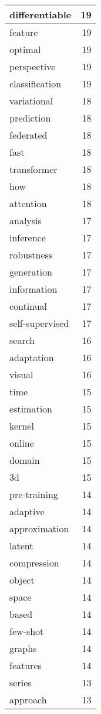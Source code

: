 \begin{table}[h]
\begin{tabular}{|l|r|}
differentiable & 19 \\
\hline
feature & 19 \\
\hline
optimal & 19 \\
\hline
perspective & 19 \\
\hline
classification & 19 \\
\hline
variational & 18 \\
\hline
prediction & 18 \\
\hline
federated & 18 \\
\hline
fast & 18 \\
\hline
transformer & 18 \\
\hline
how & 18 \\
\hline
attention & 18 \\
\hline
analysis & 17 \\
\hline
inference & 17 \\
\hline
robustness & 17 \\
\hline
generation & 17 \\
\hline
information & 17 \\
\hline
continual & 17 \\
\hline
self-supervised & 17 \\
\hline
search & 16 \\
\hline
adaptation & 16 \\
\hline
visual & 16 \\
\hline
time & 15 \\
\hline
estimation & 15 \\
\hline
kernel & 15 \\
\hline
online & 15 \\
\hline
domain & 15 \\
\hline
3d & 15 \\
\hline
pre-training & 14 \\
\hline
adaptive & 14 \\
\hline
approximation & 14 \\
\hline
latent & 14 \\
\hline
compression & 14 \\
\hline
object & 14 \\
\hline
space & 14 \\
\hline
based & 14 \\
\hline
few-shot & 14 \\
\hline
graphs & 14 \\
\hline
features & 14 \\
\hline
series & 13 \\
\hline
approach & 13 \\

\end{tabular}
\end{table}
